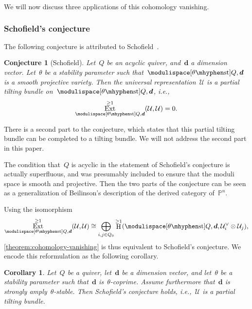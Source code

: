\documentclass[JEP,XML,SOM,Unicode,NoEqCountersInSection,published]{cedram}
\theoremstyle{plain}
\newtheorem{alphaconjecture}[alphatheorem]{Conjecture}
\newtheorem{alphacorollary}[alphatheorem]{Corollary}
\theoremstyle{definition}
\DeclareMathOperator\Ext{Ext}
\DeclareMathOperator\HH{H}
\newcommand\dash{\nobreakdash-\hspace{0pt}}
\newcommand\stable{\ensuremath{\mhyphen\mathrm{st}}}
\newcommand\tuple[1]{\ensuremath{{\boldsymbol{#1}}}}
\begin{document}
We will now discuss three applications of this cohomology vanishing.

\subsubsection*{Schofield's conjecture}
The following conjecture is attributed to Schofield~\cite[p.\,80]{MR1428456}.
\begin{alphaconjecture}[Schofield]
\label{conjecture:schofield}
Let~$Q$ be an acyclic quiver,
and~$\tuple{d}$ a dimension vector.
Let~$\theta$ be a stability parameter
such that~$\modulispace[\theta\stable]{Q,\tuple{d}}$
is a smooth projective variety.
Then the universal representation~$\mathcal{U}$
is a partial tilting bundle on~$\modulispace[\theta\stable]{Q,\tuple{d}}$,
i.e.,
\begin{equation*}
\Ext_{\modulispace[\theta\stable]{Q,\tuple{d}}}^{\geq 1}(\mathcal{U},\mathcal{U})=0.
\end{equation*}
\end{alphaconjecture}
There is a second part to the conjecture,
which states that
this partial tilting bundle can be completed to a tilting bundle.
We will not address the second part in this paper.

The condition that~$Q$ is acyclic in the statement of Schofield's conjecture
is actually superfluous,
and was presumably included to ensure that the moduli space is smooth and projective.
Then the two parts of the conjecture can be seen as a generalization
of Beilinson's description of the derived category of~$\mathbb{P}^n$.

Using the isomorphism
\begin{equation}
\label{equation:Ext-as-cohomology}
\Ext_{\modulispace[\theta\stable]{Q,\tuple{d}}}^{\geq 1}(\mathcal{U},\mathcal{U})
\cong\bigoplus_{i,j\in Q_0}\HH^{\geq 1}(\modulispace[\theta\stable]{Q,\tuple{d}},\mathcal{U}_i^\vee\otimes\mathcal{U}_j),
\end{equation}
\cref{theorem:cohomology-vanishing}
is thus equivalent to Schofield's conjecture.
We encode this reformulation as the following corollary.

\begin{alphacorollary}
\label{corollary:schofield}
Let~$Q$ be a quiver,
let~$\tuple{d}$ be a dimension vector,
and let~$\theta$ be a stability parameter
such that~$\tuple{d}$ is~$\theta$\dash coprime.
Assume furthermore that~$\tuple{d}$ is strongly amply~$\theta$\dash stable.
Then Schofield's conjecture holds,
i.e.,~$\mathcal{U}$ is a partial tilting bundle.
\end{alphacorollary}
\end{document}
